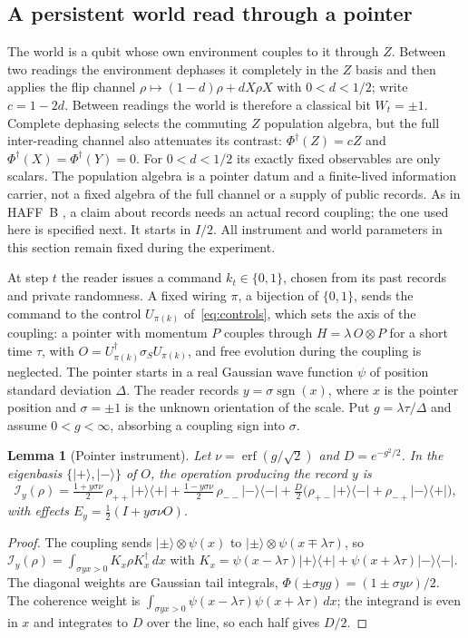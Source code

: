 \documentclass[11pt,a4paper]{article}
\newtheorem{lemma}[definition]{Lemma}
\begin{document}
\subsection{A persistent world read through a pointer}\label{subsec:pointer}

The world is a qubit whose own environment couples to it through $Z$. Between two readings the environment dephases it completely in the $Z$ basis and then applies the flip channel $\rho\mapsto(1-d)\rho+dX\rho X$ with $0<d<1/2$; write $c=1-2d$. Between readings the world is therefore a classical bit $W_t=\pm1$. Complete dephasing selects the commuting $Z$ population algebra, but the full inter-reading channel also attenuates its contrast: $\Phi^\dagger(Z)=cZ$ and $\Phi^\dagger(X)=\Phi^\dagger(Y)=0$. For $0<d<1/2$ its exactly fixed observables are only scalars. The population algebra is a pointer datum and a finite-lived information carrier, not a fixed algebra of the full channel or a supply of public records. As in HAFF~B \cite{HAFFB}, a claim about records needs an actual record coupling; the one used here is specified next. It starts in $I/2$. All instrument and world parameters in this section remain fixed during the experiment.

At step $t$ the reader issues a command $k_t\in\{0,1\}$, chosen from its past records and private randomness. A fixed wiring $\pi$, a bijection of $\{0,1\}$, sends the command to the control $U_{\pi(k)}$ of~\eqref{eq:controls}, which sets the axis of the coupling: a pointer with momentum $P$ couples through $H=\lambda\,O\otimes P$ for a short time $\tau$, with $O=U_{\pi(k)}^\dagger\sigma_SU_{\pi(k)}$, and free evolution during the coupling is neglected. The pointer starts in a real Gaussian wave function $\psi$ of position standard deviation $\Delta$. The reader records $y=\sigma\operatorname{sgn}(x)$, where $x$ is the pointer position and $\sigma=\pm1$ is the unknown orientation of the scale. Put $g=\lambda\tau/\Delta$ and assume $0<g<\infty$, absorbing a coupling sign into $\sigma$.

\begin{lemma}[Pointer instrument]\label{lem:pointer}
Let $\nu=\operatorname{erf}(g/\sqrt2)$ and $D=e^{-g^2/2}$. In the eigenbasis $\{|{+}\rangle,|{-}\rangle\}$ of $O$, the operation producing the record $y$ is
\[
 \mathcal I_y(\rho)=\tfrac{1+y\sigma\nu}{2}\,\rho_{++}|{+}\rangle\langle{+}|
 +\tfrac{1-y\sigma\nu}{2}\,\rho_{--}|{-}\rangle\langle{-}|
 +\tfrac D2\bigl(\rho_{+-}|{+}\rangle\langle{-}|+\rho_{-+}|{-}\rangle\langle{+}|\bigr),
\]
with effects $E_y=\tfrac12(I+y\sigma\nu O)$.
\end{lemma}
\begin{proof}
The coupling sends $|{\pm}\rangle\otimes\psi(x)$ to $|{\pm}\rangle\otimes\psi(x\mp\lambda\tau)$, so $\mathcal I_y(\rho)=\int_{\sigma yx>0}K_x\rho K_x^\dagger\,dx$ with $K_x=\psi(x-\lambda\tau)|{+}\rangle\langle{+}|+\psi(x+\lambda\tau)|{-}\rangle\langle{-}|$. The diagonal weights are Gaussian tail integrals, $\Phi(\pm\sigma yg)=(1\pm\sigma y\nu)/2$. The coherence weight is $\int_{\sigma yx>0}\psi(x-\lambda\tau)\psi(x+\lambda\tau)\,dx$; the integrand is even in $x$ and integrates to $D$ over the line, so each half gives $D/2$.
\end{proof}
\end{document}
